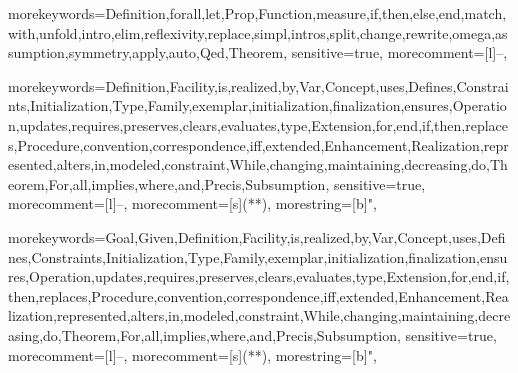\usepackage{listings}
\usepackage{amsthm}
\usepackage{amsfonts}
\usepackage{amssymb}
\usepackage{amsmath}
\usepackage{caption}
\usepackage{subcaption}
\usepackage{mathrsfs}

\setcounter{secnumdepth}{3}

\newtheorem{thm}{Theorem}


	{
		morekeywords={Definition,forall,let,Prop,Function,measure,if,then,else,end,match,with,unfold,intro,elim,reflexivity,replace,simpl,intros,split,change,rewrite,omega,assumption,symmetry,apply,auto,Qed,Theorem},
		sensitive=true,
		morecomment=[l]{--},
	}

	{
		morekeywords={Definition,Facility,is,realized,by,Var,Concept,uses,Defines,Constraints,Initialization,Type,Family,exemplar,initialization,finalization,ensures,Operation,updates,requires,preserves,clears,evaluates,type,Extension,for,end,if,then,replaces,Procedure,convention,correspondence,iff,extended,Enhancement,Realization,represented,alters,in,modeled,constraint,While,changing,maintaining,decreasing,do,Theorem,For,all,implies,where,and,Precis,Subsumption},
		sensitive=true,
		morecomment=[l]{--},
		morecomment=[s]{(*}{*)},
		morestring=[b]",
	}

	{
		morekeywords={Goal,Given,Definition,Facility,is,realized,by,Var,Concept,uses,Defines,Constraints,Initialization,Type,Family,exemplar,initialization,finalization,ensures,Operation,updates,requires,preserves,clears,evaluates,type,Extension,for,end,if,then,replaces,Procedure,convention,correspondence,iff,extended,Enhancement,Realization,represented,alters,in,modeled,constraint,While,changing,maintaining,decreasing,do,Theorem,For,all,implies,where,and,Precis,Subsumption},
		sensitive=true,
		morecomment=[l]{--},
		morecomment=[s]{(*}{*)},
		morestring=[b]",
	}
\lstset{language=resolve}

\usepackage{graphicx}

\newcommand{\cplusplus}{{\rm C\raise.5ex\hbox{\small ++}}}
